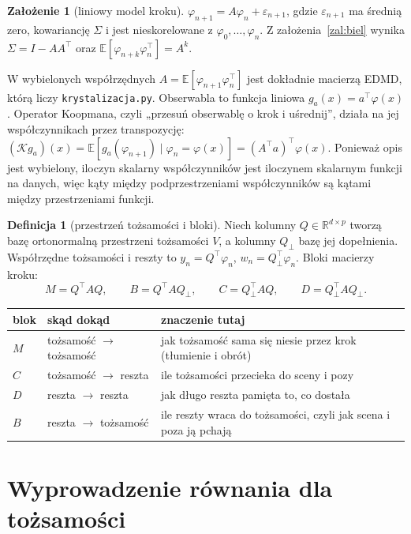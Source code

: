 \documentclass[11pt,a4paper]{article}
\theoremstyle{definition}
\newtheorem{definicja}{Definicja}
\newtheorem{zalozenie}{Założenie}
\theoremstyle{remark}
\newcommand{\E}{\mathbb{E}}
\newcommand{\R}{\mathbb{R}}
\newcommand{\Qp}{Q_{\perp}}
\newcommand{\T}{^{\top}}
\begin{document}
\begin{zalozenie}[liniowy model kroku]\label{zal:lin}
$\varphi_{n+1} = A\varphi_n + \varepsilon_{n+1}$, gdzie $\varepsilon_{n+1}$ ma średnią zero, kowariancję
$\Sigma$ i jest nieskorelowane z $\varphi_0,\dots,\varphi_n$. Z założenia~\ref{zal:biel} wynika
$\Sigma = I - AA\T$ oraz $\E[\varphi_{n+k}\varphi_n\T] = A^k$.
\end{zalozenie}

W wybielonych współrzędnych $A = \E[\varphi_{n+1}\varphi_n\T]$ jest dokładnie macierzą EDMD, którą liczy
\texttt{krystalizacja.py}. Obserwabla to funkcja liniowa $g_a(x) = a\T\varphi(x)$. Operator Koopmana,
czyli „przesuń obserwablę o krok i uśrednij”, działa na jej współczynnikach przez transpozycję:
$(\mathcal K g_a)(x) = \E[g_a(\varphi_{n+1})\mid\varphi_n=\varphi(x)] = (A\T a)\T\varphi(x)$.
Ponieważ opis jest wybielony, iloczyn skalarny współczynników jest iloczynem skalarnym funkcji na danych,
więc kąty między podprzestrzeniami współczynników są kątami między przestrzeniami funkcji.

\begin{definicja}[przestrzeń tożsamości i bloki]
Niech kolumny $Q\in\R^{d\times p}$ tworzą bazę ortonormalną przestrzeni tożsamości $V$,
a kolumny $\Qp$ bazę jej dopełnienia. Współrzędne tożsamości i reszty to
$y_n = Q\T\varphi_n$, $w_n = \Qp\T\varphi_n$. Bloki macierzy kroku:
\[
M = Q\T A Q,\qquad B = Q\T A\Qp,\qquad C = \Qp\T A Q,\qquad D = \Qp\T A\Qp .
\]
\end{definicja}

\begin{center}
\begin{tabular}{@{}lll@{}}
\toprule
blok & skąd dokąd & znaczenie tutaj\\
\midrule
$M$ & tożsamość $\to$ tożsamość & jak tożsamość sama się niesie przez krok (tłumienie i obrót)\\
$C$ & tożsamość $\to$ reszta & ile tożsamości przecieka do sceny i pozy\\
$D$ & reszta $\to$ reszta & jak długo reszta pamięta to, co dostała\\
$B$ & reszta $\to$ tożsamość & ile reszty wraca do tożsamości, czyli jak scena i poza ją pchają\\
\bottomrule
\end{tabular}
\end{center}

\section{Wyprowadzenie równania dla tożsamości}
\end{document}
